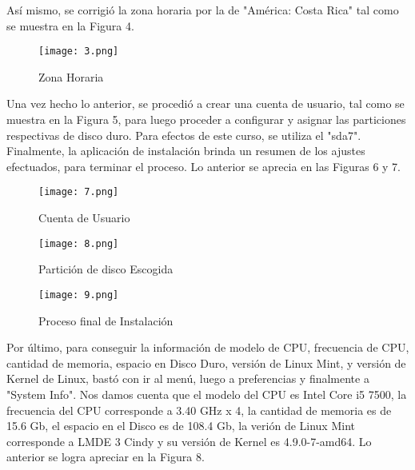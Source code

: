 \documentclass[
  letterpaper, 
  maincolor=black,
  sectioncolor=black!90,
  subsectioncolor=black!70,
  itemtextcolor=black!40,
]{fortysecondscv}
\begin{document}
{\Large
Así mismo, se corrigió la zona horaria por la de "América: Costa Rica" tal como se muestra en la Figura 4.}

\begin{center}
    \begin{figure}[H]
    \centering
    \texttt{[image: 3.png]}
    \caption{Zona Horaria}
    \label{fig:3.png}
    \end{figure}
\end{center}

{\Large
Una vez hecho lo anterior, se procedió a crear una cuenta de usuario, tal como se muestra en la Figura 5, para luego proceder a configurar y asignar las particiones respectivas de disco duro. Para efectos de este curso, se utiliza el "sda7". Finalmente, la aplicación de instalación brinda un resumen de los ajustes efectuados, para terminar el proceso. Lo anterior se aprecia en las Figuras 6 y 7.}

\begin{center}
    \begin{figure}[H]
    \centering
    \texttt{[image: 7.png]}
    \caption{Cuenta de Usuario}
    \label{fig:7.png}
    \end{figure}
\end{center}

\begin{center}
    \begin{figure}[H]
    \centering
    \texttt{[image: 8.png]}
    \caption{Partición de disco Escogida}
    \label{fig:8.png}
    \end{figure}
\end{center}

\begin{center}
    \begin{figure}[H]
    \centering
    \texttt{[image: 9.png]}
    \caption{Proceso final de Instalación}
    \label{fig:9.png}
    \end{figure}
\end{center}

{\Large
Por último, para conseguir la información de modelo de CPU, frecuencia de CPU, cantidad de memoria, espacio en Disco Duro, versión de Linux Mint, y versión de Kernel de Linux, bastó con ir al menú, luego a preferencias y finalmente a "System Info". Nos damos cuenta que el modelo del CPU es Intel Core i5 7500, la frecuencia del CPU corresponde a 3.40 GHz x 4, la cantidad de memoria es de 15.6 Gb, el espacio en el Disco es de 108.4 Gb, la verión de Linux Mint corresponde a LMDE 3 Cindy y su versión de Kernel es 4.9.0-7-amd64. Lo anterior se logra apreciar en la Figura 8.}
\end{document}
